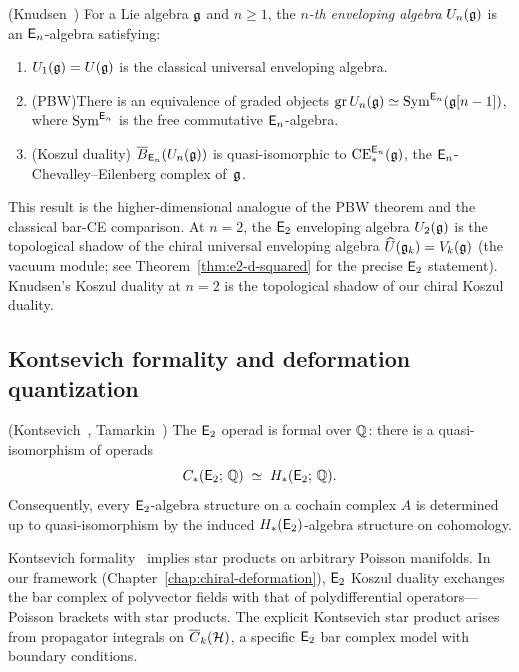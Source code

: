 \begin{theorem}
\label{thm:knudsen-higher-enveloping}
\textup{(}Knudsen~\cite{Knudsen18}\textup{)}\quad
For a Lie algebra $\mathfrak{g}$ and $n \geq 1$, the \emph{$n$-th enveloping
algebra} $U_n(\mathfrak{g})$ is an $\mathsf{E}_n$-algebra satisfying:
\begin{enumerate}[label=\textup{(\roman*)}]
\item $U_1(\mathfrak{g}) = U(\mathfrak{g})$ is the classical universal enveloping
  algebra.
\item \textup{(PBW)}\quad There is an equivalence of graded objects
  $\mathrm{gr}\, U_n(\mathfrak{g}) \simeq \mathrm{Sym}^{\mathsf{E}_n}(\mathfrak{g}[n-1])$,
  where $\mathrm{Sym}^{\mathsf{E}_n}$ is the free commutative $\mathsf{E}_n$-algebra.
\item \textup{(Koszul duality)}\quad
  $\overline{B}_{\mathsf{E}_n}(U_n(\mathfrak{g}))$ is quasi-isomorphic to
  $\mathrm{CE}^{\mathsf{E}_n}_*(\mathfrak{g})$, the $\mathsf{E}_n$-Chevalley--Eilenberg
  complex of~$\mathfrak{g}$.
\end{enumerate}
\end{theorem}

This result is the higher-dimensional analogue of the PBW theorem
and the classical bar-CE comparison.  At $n = 2$, the $\mathsf{E}_2$
enveloping algebra $U_2(\mathfrak{g})$ is the topological shadow of the
chiral universal enveloping algebra
$\widehat{U}(\mathfrak{g}_k) = V_k(\mathfrak{g})$ (the vacuum module; see Theorem~\ref{thm:e2-d-squared} for the precise $\mathsf{E}_2$ statement).  Knudsen's
Koszul duality at $n = 2$ is the topological shadow of our chiral
Koszul duality.


\subsection{Kontsevich formality and deformation quantization}

\begin{theorem}
\label{thm:e2-formality}
\textup{(}Kontsevich~\cite{Kontsevich03},
Tamarkin~\cite{Tamarkin00}\textup{)}\quad
The $\mathsf{E}_2$ operad is formal over $\mathbb{Q}$: there is a
quasi-isomorphism of operads
\[
C_*(\mathsf{E}_2;\, \mathbb{Q})
\;\simeq\;
H_*(\mathsf{E}_2;\, \mathbb{Q}).
\]
Consequently, every $\mathsf{E}_2$-algebra structure on a
cochain complex $A$ is determined up to quasi-isomorphism by the
induced $H_*(\mathsf{E}_2)$-algebra structure on cohomology.
\end{theorem}

\begin{remark}
\label{rem:formality-dq}
Kontsevich formality~\cite{Kontsevich03} implies star products on
arbitrary Poisson manifolds.  In our framework
(Chapter~\ref{chap:chiral-deformation}), $\mathsf{E}_2$ Koszul duality
exchanges the bar complex of polyvector fields with that of
polydifferential operators---Poisson brackets with star products.
The explicit Kontsevich star product arises from propagator integrals
on $\overline{C}_k(\mathcal{H})$, a specific $\mathsf{E}_2$ bar complex
model with boundary conditions.
\end{remark}

